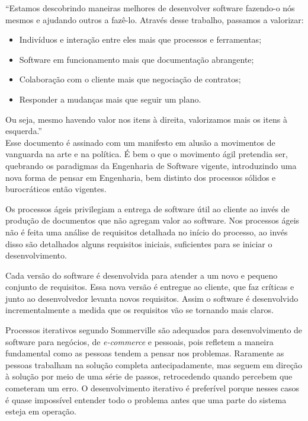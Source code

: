 	“Estamos descobrindo maneiras melhores de desenvolver software fazendo-o nós mesmos e ajudando outros a fazê-lo. Através desse trabalho, passamos a valorizar:

\begin{itemize}
\item Indivíduos e interação entre eles mais que processos e ferramentas;

\item Software em funcionamento mais que documentação abrangente;

\item Colaboração com o cliente mais que negociação de contratos;

\item Responder a mudanças mais que seguir um plano.
\end{itemize}
Ou seja, mesmo havendo valor nos itens à direita, valorizamos mais os itens à esquerda.” \\

Esse documento é assinado com um manifesto em alusão a movimentos de vanguarda na arte e na política. É bem o que o movimento ágil pretendia ser, quebrando os paradigmas da Engenharia de Software vigente, introduzindo uma nova forma de pensar em Engenharia, bem distinto dos processos sólidos e burocráticos então vigentes.

Os processos ágeis privilegiam a entrega de software útil ao cliente ao invés de produção de documentos que não agregam valor ao software. Nos processos ágeis não é feita uma análise de requisitos detalhada no início do processo, ao invés disso são detalhados alguns requisitos iniciais, suficientes para se iniciar o desenvolvimento.

Cada versão do software é desenvolvida para atender a um novo e pequeno conjunto de requisitos. Essa nova versão é entregue ao cliente, que faz críticas e junto ao desenvolvedor levanta novos requisitos. Assim o software é desenvolvido incrementalmente a medida que os requisitos vão se tornando mais claros. 

Processos iterativos segundo Sommerville \cite{Sommerville2007} são adequados para desenvolvimento de software para negócios, de \emph{e-commerce} e pessoais, pois refletem a maneira fundamental como as pessoas tendem a pensar nos problemas. Raramente  as pessoas trabalham na solução completa antecipadamente, mas seguem em direção à solução por meio de uma série de passos, retrocedendo quando percebem que cometeram um erro.  O desenvolvimento iterativo é preferível porque nesses casos é quase impossível entender todo o problema antes que uma parte do sistema esteja em operação. 

